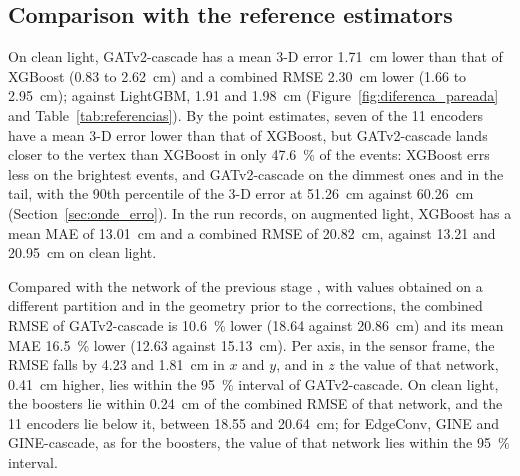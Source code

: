 \subsection{Comparison with the reference estimators}
\label{sec:comparacao_referencias}

On clean light, GATv2-cascade has a mean 3-D error \qty{1.71}{\cm} lower than that of XGBoost (\num{0.83} to \qty{2.62}{\cm}) and a combined RMSE \qty{2.30}{\cm} lower (\num{1.66} to \qty{2.95}{\cm}); against LightGBM, \num{1.91} and \qty{1.98}{\cm} (Figure~\ref{fig:diferenca_pareada} and Table~\ref{tab:referencias}). By the point estimates, seven of the \num{11} encoders have a mean 3-D error lower than that of XGBoost, but GATv2-cascade lands closer to the vertex than XGBoost in only \qty{47.6}{\percent} of the events: XGBoost errs less on the brightest events, and GATv2-cascade on the dimmest ones and in the tail, with the 90th percentile of the \mbox{3-D} error at \qty{51.26}{\cm} against \qty{60.26}{\cm} (Section~\ref{sec:onde_erro}). In the run records, on augmented light, XGBoost has a mean MAE of \qty{13.01}{\cm} and a combined RMSE of \qty{20.82}{\cm}, against \num{13.21} and \qty{20.95}{\cm} on clean light.

Compared with the network of the previous stage \citep{vicentin2024study}, with values obtained on a different partition and in the geometry prior to the corrections, the combined RMSE of GATv2-cascade is \qty{10.6}{\percent} lower (\num{18.64} against \qty{20.86}{\cm}) and its mean MAE \qty{16.5}{\percent} lower (\num{12.63} against \qty{15.13}{\cm}). Per axis, in the sensor frame, the RMSE falls by \num{4.23} and \qty{1.81}{\cm} in $x$ and $y$, and in $z$ the value of that network, \qty{0.41}{\cm} higher, lies within the \qty{95}{\percent} interval of GATv2-cascade. On clean light, the boosters lie within \qty{0.24}{\cm} of the combined RMSE of that network, and the \num{11} encoders lie below it, between \num{18.55} and \qty{20.64}{\cm}; for EdgeConv, GINE and GINE-cascade, as for the boosters, the value of that network lies within the \qty{95}{\percent} interval.

\begin{table}[H]
  \centering
  \caption{Test errors of GATv2-cascade, GPS and the reference estimators, in cm, in the sensor frame; the barycentre has a quadratic calibration. \textsuperscript{a}Quoted per-axis RMSE values, from a different partition (\qty{80}{\percent} and \qty{20}{\percent}) and from the geometry prior to the corrections \citep{vicentin2024study}, with the axes converted to this frame; combined RMSE and mean MAE computed from the published per-axis values. \textsuperscript{}A different simulation \citep{marinho2025apex}; widths read from Figure~2 of the paper at \qty{0.26}{\cm} per pixel, at equal detected light with the average yield (\qty{2.9}{\MeV}) or with the minimum (\qty{4.9}{\MeV}) and at equal energy (\qty{10}{\MeV}); the two transverse widths appear in the same cell, without assignment to $x$ and $y$; MAE not available.}
  \label{tab:referencias}
  
\end{table}

